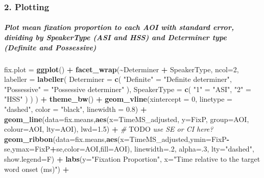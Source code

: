 \documentclass[
]{article}
\newenvironment{Shaded}{\begin{snugshade}}{\end{snugshade}}
\newcommand{\AlertTok}[1]{\textcolor[rgb]{0.94,0.16,0.16}{#1}}
\newcommand{\AttributeTok}[1]{\textcolor[rgb]{0.13,0.29,0.53}{#1}}
\newcommand{\CommentTok}[1]{\textcolor[rgb]{0.56,0.35,0.01}{\textit{#1}}}
\newcommand{\DecValTok}[1]{\textcolor[rgb]{0.00,0.00,0.81}{#1}}
\newcommand{\FloatTok}[1]{\textcolor[rgb]{0.00,0.00,0.81}{#1}}
\newcommand{\FunctionTok}[1]{\textcolor[rgb]{0.13,0.29,0.53}{\textbf{#1}}}
\newcommand{\NormalTok}[1]{#1}
\newcommand{\OtherTok}[1]{\textcolor[rgb]{0.56,0.35,0.01}{#1}}
\newcommand{\SpecialCharTok}[1]{\textcolor[rgb]{0.81,0.36,0.00}{\textbf{#1}}}
\newcommand{\StringTok}[1]{\textcolor[rgb]{0.31,0.60,0.02}{#1}}
\begin{document}
\subsubsection{2. Plotting}\label{plotting}

\subparagraph{Plot mean fixation proportion to each AOI with standard
error, dividing by SpeakerType (ASI and HSS) and Determiner type
(Definite and
Possessive)}\label{plot-mean-fixation-proportion-to-each-aoi-with-standard-error-dividing-by-speakertype-asi-and-hss-and-determiner-type-definite-and-possessive}

\begin{Shaded}
\begin{Highlighting}[]
\NormalTok{fix.plot }\OtherTok{=} \FunctionTok{ggplot}\NormalTok{() }\SpecialCharTok{+} 
  \FunctionTok{facet\_wrap}\NormalTok{(}\SpecialCharTok{\textasciitilde{}}\NormalTok{Determiner }\SpecialCharTok{+}\NormalTok{ SpeakerType, }\AttributeTok{ncol=}\DecValTok{2}\NormalTok{,}
             \AttributeTok{labeller =} \FunctionTok{labeller}\NormalTok{(}
              \AttributeTok{Determiner =} \FunctionTok{c}\NormalTok{(}
                \StringTok{"Definite"} \OtherTok{=} \StringTok{"Definite determiner"}\NormalTok{,}
                \StringTok{"Possessive"} \OtherTok{=} \StringTok{"Possessive determiner"}
\NormalTok{              ),}
              \AttributeTok{SpeakerType =} \FunctionTok{c}\NormalTok{(}
                \StringTok{"1"} \OtherTok{=} \StringTok{"ASI"}\NormalTok{,}
                \StringTok{"2"} \OtherTok{=} \StringTok{"HSS"}
\NormalTok{              )}
\NormalTok{            )}
\NormalTok{             ) }\SpecialCharTok{+} \FunctionTok{theme\_bw}\NormalTok{() }\SpecialCharTok{+} 
  \FunctionTok{geom\_vline}\NormalTok{(}\AttributeTok{xintercept =} \DecValTok{0}\NormalTok{, }\AttributeTok{linetype =} \StringTok{"dashed"}\NormalTok{, }\AttributeTok{color =} \StringTok{"black"}\NormalTok{, }\AttributeTok{linewidth =} \FloatTok{0.8}\NormalTok{) }\SpecialCharTok{+}
  \FunctionTok{geom\_line}\NormalTok{(}\AttributeTok{data=}\NormalTok{fix.means,}\FunctionTok{aes}\NormalTok{(}\AttributeTok{x=}\NormalTok{TimeMS\_adjusted, }\AttributeTok{y=}\NormalTok{FixP, }\AttributeTok{group=}\NormalTok{AOI, }\AttributeTok{colour=}\NormalTok{AOI, }\AttributeTok{lty=}\NormalTok{AOI), }\AttributeTok{lwd=}\FloatTok{1.5}\NormalTok{) }\SpecialCharTok{+} \CommentTok{\# }\AlertTok{TODO}\CommentTok{ use SE or CI here?}
  \FunctionTok{geom\_ribbon}\NormalTok{(}\AttributeTok{data=}\NormalTok{fix.means,}\FunctionTok{aes}\NormalTok{(}\AttributeTok{x=}\NormalTok{TimeMS\_adjusted,}\AttributeTok{ymin=}\NormalTok{FixP}\SpecialCharTok{{-}}\NormalTok{se,}\AttributeTok{ymax=}\NormalTok{FixP}\SpecialCharTok{+}\NormalTok{se,}\AttributeTok{color=}\NormalTok{AOI,}\AttributeTok{fill=}\NormalTok{AOI), }\AttributeTok{linewidth=}\NormalTok{.}\DecValTok{2}\NormalTok{, }\AttributeTok{alpha=}\NormalTok{.}\DecValTok{3}\NormalTok{, }\AttributeTok{lty=}\StringTok{"dashed"}\NormalTok{, }\AttributeTok{show.legend=}\NormalTok{F)  }\SpecialCharTok{+}
  \FunctionTok{labs}\NormalTok{(}\AttributeTok{y=}\StringTok{"Fixation Proportion"}\NormalTok{, }\AttributeTok{x=}\StringTok{"Time relative to the target word onset (ms)"}\NormalTok{) }\SpecialCharTok{+} 
  

\end{Highlighting}
\end{Shaded}
\end{document}
